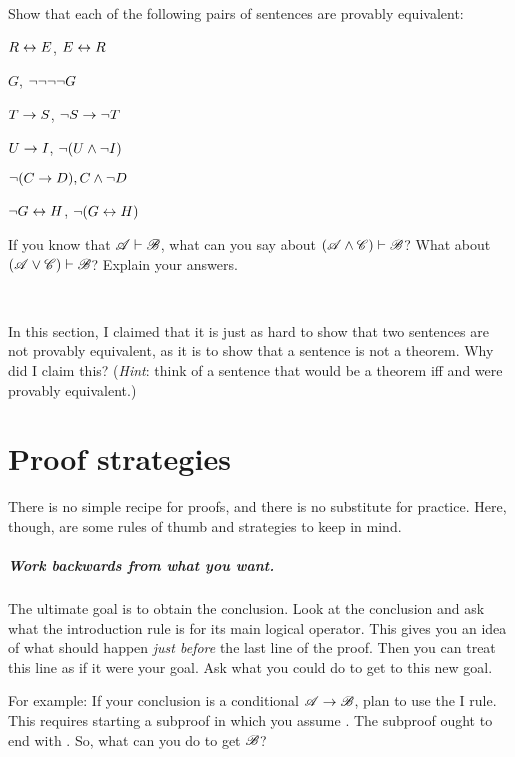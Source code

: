 \problempart
Show that each of the following pairs of sentences are provably equivalent:
\begin{earg}
\item $R \leftrightarrow E$, $E \leftrightarrow R$
\item $G$, $\neg\neg\neg\neg G$
\item $T\rightarrow S$, $\neg S \rightarrow \neg T$
\item $U \rightarrow I$, $\neg(U \wedge \neg I)$
\item $\neg (C \rightarrow D), C \wedge \neg D$
\item $\neg G \leftrightarrow H$, $\neg(G \leftrightarrow H)$ 
\end{earg}

\problempart
If you know that $\mathscr{A}\vdash\mathscr{B}$, what can you say about $(\mathscr{A}\wedge\mathscr{C})\vdash\mathscr{B}$? What about $(\mathscr{A}\vee\mathscr{C})\vdash\mathscr{B}$? Explain your answers.

\

\problempart In this section, I claimed that it is just as hard to show that two sentences are not provably equivalent, as it is to show that a sentence is not a theorem. Why did I claim this? (\emph{Hint}: think of a sentence that would be a theorem iff  and  were provably equivalent.)





\chapter{Proof strategies}
There is no simple recipe for proofs, and there is no substitute for practice. Here, though, are some rules of thumb and strategies to keep in mind.

\paragraph{Work backwards from what you want.}
The ultimate goal is to obtain the conclusion. Look at the conclusion and ask what the introduction rule is for its main logical operator. This gives you an idea of what should happen \emph{just before} the last line of the proof. Then you can treat this line as if it were your goal. Ask what you could do to get to this new goal.

For example: If your conclusion is a conditional $\mathscr{A}\rightarrow\mathscr{B}$, plan to use the {\eif}I rule. This requires starting a subproof in which you assume . The subproof ought to end with . So, what can you do to get $\mathscr{B}$?

